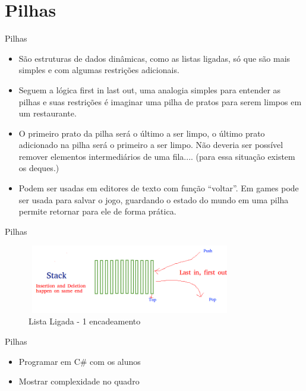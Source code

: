 \section{Pilhas}

\begin{frame}
	\begin{block}{Pilhas}
		\begin{itemize}
			\item São estruturas de dados dinâmicas, como as listas ligadas, só que são mais simples e com algumas restrições adicionais.
			
			\item Seguem a lógica first in last out, uma analogia simples para entender as pilhas e suas restrições é imaginar uma pilha de pratos para serem limpos em um restaurante.
			
			\item O primeiro prato da pilha será o último a ser limpo, o último prato adicionado na pilha será o primeiro a ser limpo. Não deveria ser possível remover elementos intermediários de uma fila.... (para essa situação existem os deques.)
			
			\item Podem ser usadas em editores de texto com função “voltar”. Em games pode ser usada para salvar o jogo, guardando o estado do mundo em uma pilha permite retornar para ele de forma prática.
		\end{itemize}
	\end{block}
\end{frame}

\begin{frame}
	\begin{block}{Pilhas}
		\begin{figure}[!htb]
			\centering	  				
			\includegraphics[height=3cm, width = 9cm]{./pic/stack.png}
			\caption{Lista Ligada - 1 encadeamento}
			\label{fig_pilha}
		\end{figure}
	\end{block}
\end{frame}

\begin{frame}
	\begin{block}{Pilhas}
		\begin{itemize}
			\item Programar em C\# com os alunos
			\item Mostrar complexidade no quadro
		\end{itemize}
	\end{block}
\end{frame}



